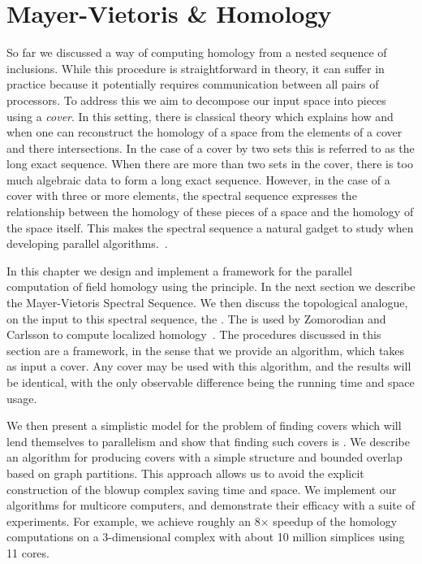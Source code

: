 \chapter{Mayer-Vietoris \& Homology}
So far we discussed a way of computing homology from a 
nested sequence of inclusions. While this procedure is straightforward in theory, it can suffer in practice
because it potentially requires communication between all pairs of processors. To address this
we aim to decompose our input space into pieces using a \emph{cover}. In this setting, 
there is classical theory which explains how and when one can reconstruct the homology of a space
from the elements of a cover and there intersections. In the case of a cover by two sets this is referred to as
the \mv long exact sequence. When there are more than two sets in the cover, 
there is too much algebraic data to form a long exact sequence. 
However, in the case of a cover with three or more elements, the \mv spectral sequence expresses 
the relationship between the homology of these pieces of a space and the homology of the space itself.
This makes the \mv spectral sequence a natural gadget to study when developing parallel algorithms.~\cite{hatcher}. 

In this chapter we design and implement a framework for the parallel computation of field homology using the \mv principle. In the next section we describe the Mayer-Vietoris Spectral Sequence. We then discuss the topological analogue, on the input to this spectral sequence, the \mvb{}.  
The \mvb{} is used by Zomorodian and Carlsson to compute localized homology~\cite{zc-lh-08}.  The procedures discussed in this section 
are a framework, in the sense that we provide an algorithm, which takes as input a cover. Any cover may be used with this algorithm,
and the results will be identical, with the only observable difference being the running time and space usage. 

We then present a simplistic model for the problem of finding covers which will lend themselves to parallelism and show that finding such covers is \NPH{}.
We describe an algorithm for producing covers with a simple structure and bounded overlap based on graph partitions. This approach allows
us to avoid the explicit construction of the blowup complex saving time and space. We implement our algorithms for multicore computers, 
and demonstrate their efficacy with a suite of experiments.  For example, we achieve roughly an 8$\times$ 
speedup of the homology computations on a 3-dimensional complex with about 10 million simplices using 11 cores.

